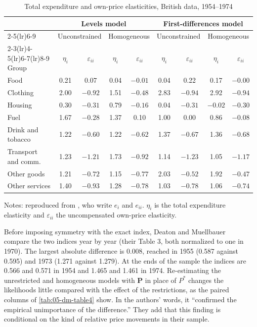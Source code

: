 \begin{table}[htbp]
\centering
\caption{Total expenditure and own-price elasticities, British data, 1954--1974}
\label{tab:05-dm-table2}
\small
\begin{tabular}{lcccccccc}
\toprule
 & \multicolumn{4}{c}{Levels model} & \multicolumn{4}{c}{First-differences model} \\
\cmidrule(lr){2-5}\cmidrule(lr){6-9}
 & \multicolumn{2}{c}{Unconstrained} & \multicolumn{2}{c}{Homogeneous}
 & \multicolumn{2}{c}{Unconstrained} & \multicolumn{2}{c}{Homogeneous} \\
\cmidrule(lr){2-3}\cmidrule(lr){4-5}\cmidrule(lr){6-7}\cmidrule(lr){8-9}
Group & $\eta_i$ & $\varepsilon_{ii}$ & $\eta_i$ & $\varepsilon_{ii}$ & $\eta_i$ & $\varepsilon_{ii}$
 & $\eta_i$ & $\varepsilon_{ii}$ \\
\midrule
Food & 0.21 & 0.07 & 0.04 & $-0.01$ & 0.04 & 0.22 & 0.17 & $-0.00$ \\
Clothing & 2.00 & $-0.92$ & 1.51 & $-0.48$ & 2.83 & $-0.94$ & 2.92 & $-0.94$ \\
Housing & 0.30 & $-0.31$ & 0.79 & $-0.16$ & 0.04 & $-0.31$ & $-0.02$ & $-0.30$ \\
Fuel & 1.67 & $-0.28$ & 1.37 & 0.10 & 1.00 & 0.00 & 0.86 & $-0.08$ \\
Drink and tobacco & 1.22 & $-0.60$ & 1.22 & $-0.62$ & 1.37 & $-0.67$ & 1.36 & $-0.68$ \\
Transport and comm. & 1.23 & $-1.21$ & 1.73 & $-0.92$ & 1.14 & $-1.23$ & 1.05 & $-1.17$ \\
Other goods & 1.21 & $-0.72$ & 1.15 & $-0.77$ & 2.03 & $-0.52$ & 1.92 & $-0.47$ \\
Other services & 1.40 & $-0.93$ & 1.28 & $-0.78$ & 1.03 & $-0.78$ & 1.06 & $-0.74$ \\
\bottomrule
\end{tabular}

\smallskip
\begin{minipage}{0.94\textwidth}
\footnotesize Notes: reproduced from \citet[Table~2]{DeatonMuellbauer1980a}, who write $e_i$ and $e_{ii}$.
$\eta_i$ is the total expenditure elasticity and $\varepsilon_{ii}$ the uncompensated own-price
elasticity.
\end{minipage}
\end{table}

Before imposing symmetry with the exact index, Deaton and Muellbauer compare the two indices year by year
(their Table 3, both normalized to one in 1970). The largest absolute difference is 0.008, reached in 1955
(0.587 against 0.595) and 1973 (1.271 against 1.279). At the ends of the sample the indices are 0.566 and
0.571 in 1954 and 1.465 and 1.461 in 1974. Re-estimating the unrestricted and homogeneous models with
$\mathbf{P}$ in place of $P^*$ changes the likelihoods little compared with the effect of the
restrictions, as the paired columns of \cref{tab:05-dm-table4} show. In the authors' words, it
``confirmed the empirical unimportance of the difference.'' They add that this finding is conditional on the kind of relative
price movements in their sample.

